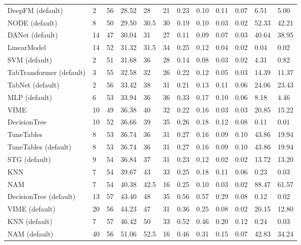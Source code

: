 \begin{tabular}{lllllrllllll}
DeepFM (default) & 2 & 56 & 28.52 & 28 & 21 & 0.23 & 0.10 & 0.11 & 0.07 & 6.51 & 5.00 \\
NODE (default) & 8 & 50 & 29.50 & 30.5 & 30 & 0.19 & 0.10 & 0.03 & 0.02 & 52.33 & 42.21 \\
DANet (default) & 14 & 47 & 30.04 & 31 & 27 & 0.11 & 0.09 & 0.07 & 0.03 & 40.64 & 38.95 \\
LinearModel & 14 & 52 & 31.32 & 31.5 & 34 & 0.25 & 0.12 & 0.04 & 0.02 & 0.04 & 0.02 \\
SVM (default) & 2 & 51 & 31.68 & 36 & 28 & 0.14 & 0.08 & 0.03 & 0.02 & 4.31 & 0.82 \\
TabTransformer (default) & 3 & 55 & 32.58 & 32 & 26 & 0.22 & 0.12 & 0.05 & 0.03 & 14.39 & 11.37 \\
TabNet (default) & 2 & 56 & 33.42 & 38 & 31 & 0.21 & 0.13 & 0.11 & 0.06 & 24.06 & 23.43 \\
MLP (default) & 6 & 53 & 33.94 & 36 & 36 & 0.33 & 0.17 & 0.10 & 0.06 & 8.18 & 4.46 \\
VIME & 10 & 49 & 36.38 & 40 & 32 & 0.22 & 0.16 & 0.03 & 0.03 & 20.85 & 15.22 \\
DecisionTree & 10 & 52 & 36.66 & 39 & 35 & 0.26 & 0.18 & 0.12 & 0.08 & 0.11 & 0.01 \\
TuneTables & 8 & 53 & 36.74 & 36 & 31 & 0.27 & 0.16 & 0.09 & 0.10 & 43.86 & 19.94 \\
TuneTables (default) & 8 & 53 & 36.74 & 36 & 31 & 0.27 & 0.16 & 0.09 & 0.10 & 43.86 & 19.94 \\
STG (default) & 9 & 54 & 36.84 & 37 & 31 & 0.23 & 0.12 & 0.02 & 0.02 & 13.72 & 13.20 \\
KNN & 7 & 54 & 39.67 & 43 & 33 & 0.25 & 0.18 & 0.11 & 0.06 & 0.23 & 0.03 \\
NAM & 7 & 54 & 40.38 & 42.5 & 16 & 0.25 & 0.10 & 0.03 & 0.02 & 88.47 & 61.57 \\
DecisionTree (default) & 13 & 57 & 43.40 & 48 & 35 & 0.56 & 0.57 & 0.29 & 0.08 & 0.12 & 0.02 \\
VIME (default) & 20 & 56 & 44.23 & 47 & 31 & 0.36 & 0.25 & 0.08 & 0.02 & 20.15 & 12.80 \\
KNN (default) & 7 & 57 & 46.42 & 50 & 33 & 0.52 & 0.46 & 0.20 & 0.12 & 0.24 & 0.03 \\
NAM (default) & 40 & 56 & 51.06 & 52.5 & 16 & 0.46 & 0.31 & 0.15 & 0.07 & 42.83 & 34.24 \\
\bottomrule
\end{tabular}
